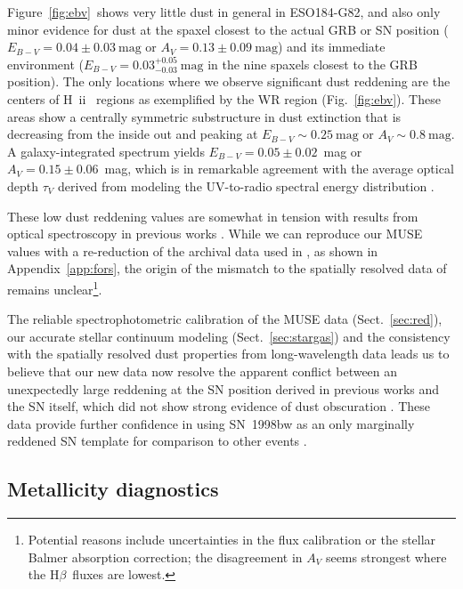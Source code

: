 \documentclass[traditabstract]{aa}
\newcommand{\hb}{H$\beta$}
\newcommand{\hii}{\mbox{H~{\sc ii}}}
\begin{document}
Figure~\ref{fig:ebv}~shows very little dust in general in ESO184-G82, and also only minor evidence for dust at the spaxel closest to the actual GRB or SN position ($E_{B-V} = 0.04\pm0.03~\mathrm{mag}$ or $A_V = 0.13\pm0.09~\mathrm{mag}$) and its immediate environment ($E_{B-V} = 0.03_{-0.03}^{+0.05}~\mathrm{mag}$ in the nine spaxels closest to the GRB position). The only locations where we observe significant dust reddening are the centers of \hii~ regions as exemplified by the WR region (Fig.~\ref{fig:ebv}). These areas show a centrally symmetric substructure in dust extinction that is decreasing from the inside out and peaking at $E_{B-V} \sim 0.25~\mathrm{mag}$ or $A_V \sim 0.8~\mathrm{mag}$. A galaxy-integrated spectrum yields $E_{B-V} = 0.05\pm0.02$~mag or $A_V=0.15\pm0.06$~mag, which is in remarkable agreement with the average optical depth $\tau_V$ derived from modeling the UV-to-radio spectral energy distribution \citep{2014A&A...562A..70M}.

These low dust reddening values are somewhat in tension with results from optical spectroscopy in previous works \citep{2006A&A...454..103H, 2008A&A...490...45C}. While we can reproduce our MUSE values with a re-reduction of the archival data used in \citet{2006A&A...454..103H}, as shown in Appendix~\ref{app:fors}, the origin of the mismatch to the spatially resolved data of \citet{2008A&A...490...45C} remains unclear\footnote{Potential reasons include uncertainties in the flux calibration or the stellar Balmer absorption correction; the disagreement in $A_V$ seems strongest where the \hb~fluxes are lowest.}.

The reliable spectrophotometric calibration of the MUSE data (Sect.~\ref{sec:red}), our accurate stellar continuum modeling (Sect.~\ref{sec:stargas}) and the consistency with the {spatially resolved dust properties from long-wavelength data \citep{2014A&A...562A..70M}} leads us to believe that our new data now resolve the apparent conflict between an unexpectedly large reddening at the SN position derived in previous {works} and the SN itself, which did not show strong evidence of dust obscuration \citep[e.g.,][]{1998Natur.395..672I, 2001ApJ...555..900P}. These data provide further confidence in using SN~1998bw as an only marginally reddened SN template for comparison to other events \citep[e.g.,][and references therein]{2004ApJ...609..952Z, 2014A&A...566A.102S, 2016arXiv160606791K}.

\subsection{Metallicity diagnostics}
\end{document}
